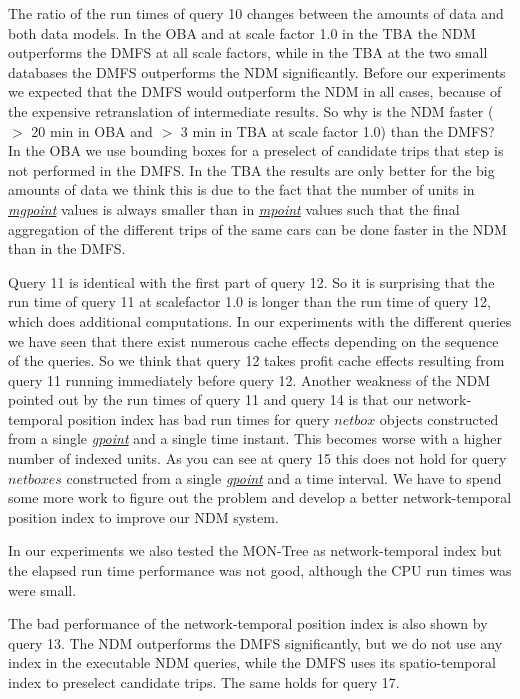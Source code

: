 \documentclass[a4paper]{article}
\newcommand{\dt}[1]{\textsl{\underline{#1}}}
\begin{document}
The ratio of the run times of query 10 changes between the amounts of data and
both data models. In the OBA and at scale factor 1.0 in the TBA the NDM outperforms
the DMFS at all scale factors, while in the TBA at the two small databases the
DMFS outperforms the NDM significantly. Before our experiments we expected that
the DMFS would outperform the NDM in all cases, because of the expensive
retranslation of intermediate results. So why is the NDM faster ($>$ 20 min in
OBA and $>$ 3 min in TBA at scale factor 1.0) than the DMFS?
In the OBA we use bounding boxes for a preselect of candidate trips that step is not
performed in the DMFS. In the TBA the results are only better for the big amounts
of data we think this is due to the fact that the number of units in \dt{mgpoint}
values is always smaller than in \dt{mpoint} values such that the final aggregation
of the different trips of the same cars can be done faster in the NDM
than in the DMFS.

Query 11 is identical with the first part of query 12. So it is surprising that
the run time of query 11 at scalefactor 1.0 is longer than the run time of query 12,
which does additional computations. In our experiments with the different queries
we have seen that there exist numerous cache effects depending on the sequence of
the queries. So we think that query 12 takes profit cache effects resulting from
query 11 running immediately before query 12. Another weakness of the NDM pointed
out by the run times of query 11 and query 14 is that our
network-temporal position index has bad run times for query $netbox$ objects
constructed from a single \dt{gpoint} and a single time instant. This becomes worse
with a higher number of indexed units. As you can see at query 15 this does not
hold for query $netboxes$ constructed from a single \dt{gpoint} and a time interval.
We have to spend some more work to figure out the problem and develop a better
network-temporal position index to improve our NDM system.

In our experiments we also tested the MON-Tree \cite{MONTreeAlmeidaGeoinformatica} as network-temporal
index but the elapsed run time performance was not good, although the CPU run times
was were small.

The bad performance of the network-temporal position index is also shown by query 13.
The NDM outperforms the DMFS significantly, but we do not use any index in the
executable NDM queries, while the DMFS uses its spatio-temporal index to preselect
candidate trips. The same holds for query 17.
\end{document}
